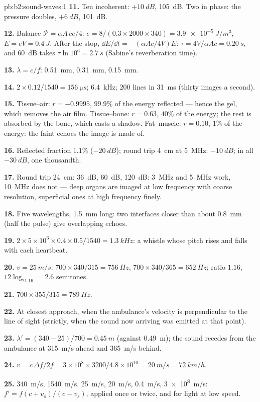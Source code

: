 \begin{solution}{pb:b2:sound-waves:1}
\textbf{11.} Ten incoherent: $+\qty{10}{dB}$, \qty{105}{dB}. Two in phase: the
pressure doubles, $+\qty{6}{dB}$, \qty{101}{dB}.

\textbf{12.} Balance $\mathcal P = \alpha A\,ce/4$: $e = 8/(0.3 \times 2000 \times 340) =
\qty{3.9e-5}{J/m^3}$, $E = eV = \qty{0.4}{J}$. After the stop, $\dd E/\dd t = -(\alpha Ac
/4V)E$: $\tau = 4V/\alpha Ac = \qty{0.20}{s}$, and \qty{60}{dB} takes $\tau\ln10^6 =
\qty{2.7}{s}$ (Sabine's reverberation time).

\textbf{13.} $\lambda = c/f$: \qty{0.51}{mm}, \qty{0.31}{mm}, \qty{0.15}{mm}.

\textbf{14.} $2 \times 0.12/1540 = \qty{156}{\micro s}$; \qty{6.4}{kHz}; $200$ lines in
\qty{31}{ms} (thirty images a second).

\textbf{15.} Tissue--air: $r = -0.9995$, $99.9\%$ of the energy reflected
--- hence the gel, which removes the air film. Tissue--bone: $r = 0.63$,
$40\%$ of the energy; the rest is absorbed by the bone, which casts a
shadow. Fat--muscle: $r = 0.10$, $1\%$ of the energy: the faint echoes the
image is made of.

\textbf{16.} Reflected fraction $1.1\%$ ($-\qty{20}{dB}$); round trip
\qty{4}{cm} at \qty{5}{MHz}: $-\qty{10}{dB}$; in all $-\qty{30}{dB}$, one thousandth.

\textbf{17.} Round trip \qty{24}{cm}: \qty{36}{dB}, \qty{60}{dB}, \qty{120}{dB}: \qty{3}{MHz}
and \qty{5}{MHz} work, \qty{10}{MHz} does not --- deep organs are imaged at
low frequency with coarse resolution, superficial ones at high
frequency finely.

\textbf{18.} Five wavelengths, \qty{1.5}{mm} long: two interfaces closer
than about \qty{0.8}{mm} (half the pulse) give overlapping echoes.

\textbf{19.} $2 \times 5 \times 10^6 \times 0.4 \times 0.5/1540 = \qty{1.3}{kHz}$: a whistle whose
pitch rises and falls with each heartbeat.

\textbf{20.} $v = \qty{25}{m/s}$: $700 \times 340/315 = \qty{756}{Hz}$, $700 \times 340/365 =
\qty{652}{Hz}$; ratio $1.16$, $12\log_21.16 = 2.6$ semitones.

\textbf{21.} $700 \times 355/315 = \qty{789}{Hz}$.

\textbf{22.} At closest approach, when the ambulance's velocity is
perpendicular to the line of sight (strictly, when the sound now
arriving was emitted at that point).

\textbf{23.} $\lambda' = (340 - 25)/700 = \qty{0.45}{m}$ (against \qty{0.49}{m}); the
sound recedes from the ambulance at \qty{315}{m/s} ahead and \qty{365}{m/s}
behind.

\textbf{24.} $v = c\,\Delta f/2f = 3 \times 10^8 \times 3200/4.8 \times 10^{10} = \qty{20}{m/s} =
\qty{72}{km/h}$.

\textbf{25.} \qty{340}{m/s}, \qty{1540}{m/s}, \qty{25}{m/s}, \qty{20}{m/s}, \qty{0.4}{m/s},
\qty{3e8}{m/s}: $f' = f(c + v_o)/(c - v_s)$, applied once or twice, and for
light at low speed.
\end{solution}
